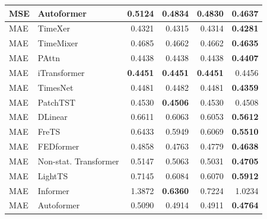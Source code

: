 \begin{longtable}{llrrrr}
MSE & Autoformer & 0.5124 & 0.4834 & 0.4830 & \textbf{0.4637} \\
\midrule
MAE & TimeXer & 0.4321 & 0.4315 & 0.4314 & \textbf{0.4281} \\
MAE & TimeMixer & 0.4685 & 0.4662 & 0.4662 & \textbf{0.4635} \\
MAE & PAttn & 0.4438 & 0.4438 & 0.4438 & \textbf{0.4407} \\
MAE & iTransformer & \textbf{0.4451} & \textbf{0.4451} & \textbf{0.4451} & 0.4456 \\
MAE & TimesNet & 0.4481 & 0.4482 & 0.4481 & \textbf{0.4359} \\
MAE & PatchTST & 0.4530 & \textbf{0.4506} & 0.4530 & 0.4508 \\
MAE & DLinear & 0.6611 & 0.6063 & 0.6053 & \textbf{0.5612} \\
MAE & FreTS & 0.6433 & 0.5949 & 0.6069 & \textbf{0.5510} \\
MAE & FEDformer & 0.4858 & 0.4763 & 0.4779 & \textbf{0.4638} \\
MAE & Non-stat. Transformer & 0.5147 & 0.5063 & 0.5031 & \textbf{0.4705} \\
MAE & LightTS & 0.7145 & 0.6084 & 0.6070 & \textbf{0.5912} \\
MAE & Informer & 1.3872 & \textbf{0.6360} & 0.7224 & 1.0234 \\
MAE & Autoformer & 0.5090 & 0.4914 & 0.4911 & \textbf{0.4764} \\
\end{longtable}
\endgroup

